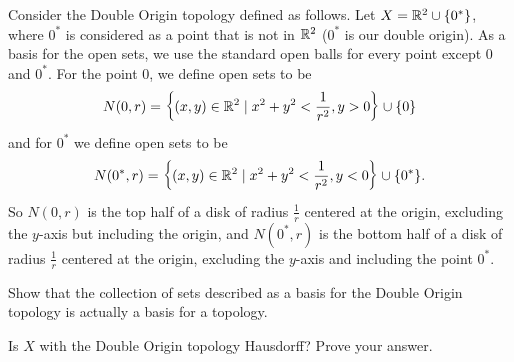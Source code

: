 \item Consider the Double Origin topology defined as follows. Let $X = \mathbb{R}^2 \cup \{0^*\}$, where $0^*$ is considered as a point that is not in $\mathbb{R}^2$ ($0^*$ is our double origin). As a basis for the open sets, we use the standard open balls for every point except $0$ and $0^*$. For the point $0$, we define open sets to be 
\[N(0,r) = \left\{(x,y) \in \mathbb{R}^2 \mid x^2+y^2 < \frac{1}{r^2}, y > 0\right\}  \cup \{0\}\]
and for $0^*$ we define open sets to be 
\[N(0^*, r) =  \left\{(x,y) \in \mathbb{R}^2 \mid x^2+y^2 < \frac{1}{r^2}, y < 0\right\}  \cup \{0^*\}.\]
So $N(0,r)$ is the top half of a disk of radius $\frac{1}{r}$ centered at the origin, excluding the $y$-axis but including the origin, and $N(0^*,r)$ is the bottom half of a disk of radius $\frac{1}{r}$ centered at the origin, excluding the $y$-axis and including the point $0^*$.
 
 \ba
 
 \item Show that the collection of sets described as a basis for the Double Origin topology is actually a basis for a topology.
 
 \item Is $X$ with the Double Origin topology Hausdorff? Prove your answer. 


\ea


